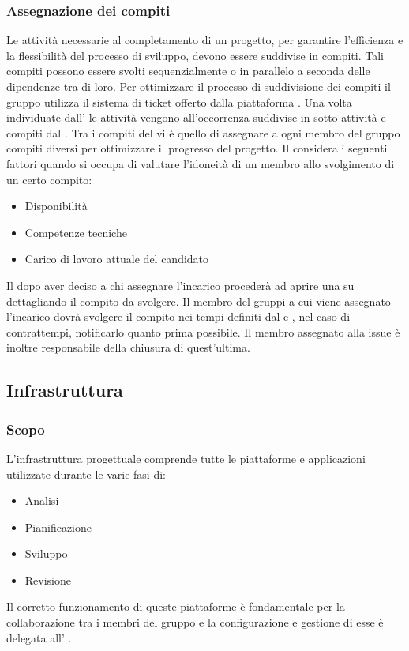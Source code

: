 \subsubsection{Assegnazione dei compiti}
Le attività necessarie al completamento di un progetto, per garantire l'efficienza e la flessibilità del processo di sviluppo, devono essere suddivise in compiti. Tali compiti possono essere svolti sequenzialmente o in parallelo a seconda delle dipendenze tra di loro. Per ottimizzare il processo di suddivisione dei compiti il gruppo utilizza il sistema di ticket offerto dalla piattaforma .
Una volta individuate dall' \ana{} le attività vengono all'occorrenza suddivise in sotto attività e compiti dal \RdP{}. Tra i compiti del \RdP{} vi è quello di assegnare a ogni membro del gruppo compiti diversi per ottimizzare il progresso del progetto. Il \RdP{} considera i seguenti fattori quando si occupa di valutare l'idoneità di un membro allo svolgimento di un certo compito:
\begin{itemize}
\item Disponibilità
\item Competenze tecniche
\item Carico di lavoro attuale del candidato
\end{itemize}
Il \RdP{} dopo aver deciso a chi assegnare l'incarico procederà ad aprire una  su  dettagliando il compito da svolgere.
Il membro del gruppi a cui viene assegnato l'incarico dovrà svolgere il compito nei tempi definiti dal \RdP{} e , nel caso di contrattempi, notificarlo quanto prima possibile. Il membro assegnato alla issue è inoltre responsabile della chiusura di quest'ultima.

\subsection{Infrastruttura}
\subsubsection{Scopo}
L'infrastruttura progettuale comprende tutte le piattaforme e applicazioni utilizzate durante le varie fasi di:
\begin{itemize}
\item Analisi
\item Pianificazione
\item Sviluppo
\item Revisione
\end{itemize}
Il corretto funzionamento di queste piattaforme è fondamentale per la collaborazione tra i membri del gruppo e la configurazione e gestione di esse è delegata all' \adm{}.

